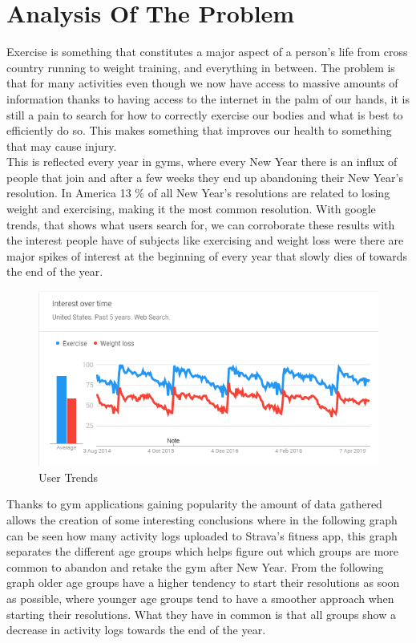 \chapter{Analysis Of The Problem}\label{sec:chap:3}
Exercise is something that constitutes a major aspect of a person’s life from cross country running to weight training, and everything in between. The problem is that for many activities even though we now have access to massive amounts of information thanks to having access to the internet in the palm of our hands, it is still a pain to search for how to correctly exercise our bodies and what is best to efficiently do so. This makes something that improves our health to something that may cause injury.\\

 
This is reflected every year in gyms, where every New Year there is an influx of people that join and after a few weeks they end up abandoning their New Year’s resolution. In America 13 \% of all New Year’s resolutions are related to losing weight and exercising, making it the most common resolution. With google trends, that shows what users search for, we can corroborate these results with the interest people have of subjects like exercising and weight loss were there are major spikes of interest at the beginning of every year that slowly dies of towards the end of the year.\cite{newyear}


\begin{center}
	\begin{figure}[h!]
		\centering
		\includegraphics[scale=0.9]{./images/2-new-year-exercise}
		\caption{User Trends}
		\label{user-trends-gym}
	\end{figure}
\end{center}

Thanks to gym applications gaining popularity the amount of data gathered allows the creation of some interesting conclusions where in the following graph can be seen how many activity logs uploaded to Strava’s fitness app, this graph separates the different age groups which helps figure out which groups are more common to abandon and retake the gym after New Year. From the following graph older age groups have a higher tendency to start their resolutions as soon as possible, where younger age groups tend to have a smoother approach when starting their resolutions. What they have in common is that all groups show a decrease in activity logs towards the end of the year.\cite{newyear}\\


